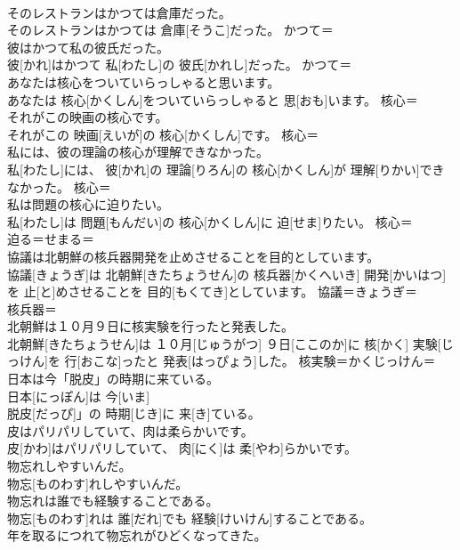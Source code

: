 \documentclass[8pt]{extreport}
\begin{document}
\begin{CJK}{UTF8}{min}
\\	そのレストランはかつては倉庫だった。	
\\	そのレストランはかつては 倉庫[そうこ]だった。	かつて＝ 
\\	彼はかつて私の彼氏だった。	
\\	彼[かれ]はかつて 私[わたし]の 彼氏[かれし]だった。	かつて＝ 
\\	あなたは核心をついていらっしゃると思います。	
\\	あなたは 核心[かくしん]をついていらっしゃると 思[おも]います。	核心＝ 
\\	それがこの映画の核心です。	
\\	それがこの 映画[えいが]の 核心[かくしん]です。	核心＝ 
\\	私には、彼の理論の核心が理解できなかった。	
\\	私[わたし]には、 彼[かれ]の 理論[りろん]の 核心[かくしん]が 理解[りかい]できなかった。	核心＝ 
\\	私は問題の核心に迫りたい。	
\\	私[わたし]は 問題[もんだい]の 核心[かくしん]に 迫[せま]りたい。	核心＝ 
\\	迫る＝せまる＝ 
\\	協議は北朝鮮の核兵器開発を止めさせることを目的としています。	
\\	協議[きょうぎ]は 北朝鮮[きたちょうせん]の 核兵器[かくへいき] 開発[かいはつ]を 止[と]めさせることを 目的[もくてき]としています。	協議＝きょうぎ＝ 
\\	核兵器＝ 
\\	北朝鮮は１０月９日に核実験を行ったと発表した。	
\\	北朝鮮[きたちょうせん]は １０月[じゅうがつ] ９日[ここのか]に 核[かく] 実験[じっけん]を 行[おこな]ったと 発表[はっぴょう]した。	核実験＝かくじっけん＝ 
\\	日本は今「脱皮」の時期に来ている。	
\\	日本[にっぽん]は 今[いま]
\\	脱皮[だっぴ]」の 時期[じき]に 来[き]ている。	
\\	皮はパリパリしていて、肉は柔らかいです。	
\\	皮[かわ]はパリパリしていて、 肉[にく]は 柔[やわ]らかいです。	
\\	物忘れしやすいんだ。	
\\	物忘[ものわす]れしやすいんだ。	
\\	物忘れは誰でも経験することである。	
\\	物忘[ものわす]れは 誰[だれ]でも 経験[けいけん]することである。	
\\	年を取るにつれて物忘れがひどくなってきた。	

\end{CJK}
\end{document}
